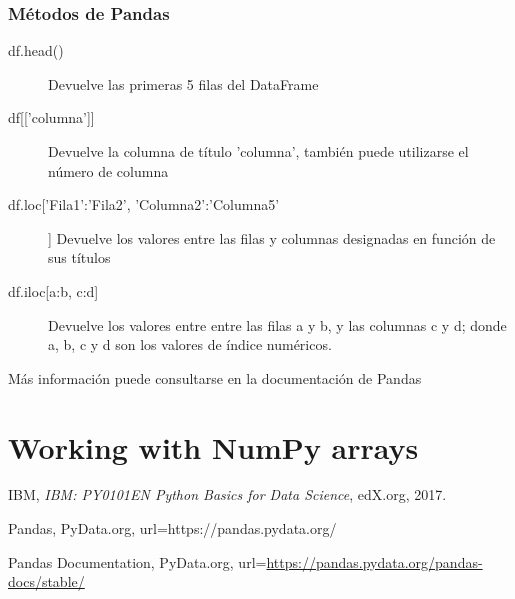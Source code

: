 \documentclass[10pt,a4paper]{article}
\begin{document}
\subsubsection{Métodos de Pandas}
\begin{description}
\item [df.head()] Devuelve las primeras 5 filas del DataFrame
\item [{df[['columna']]}]  Devuelve la columna de título 'columna', también puede utilizarse el número de columna
\item [df.loc['Fila1':'Fila2', 'Columna2':'Columna5']] Devuelve los valores entre las filas y columnas designadas en función de sus títulos
\item [{df.iloc[a:b, c:d]}] Devuelve los valores entre entre las filas a y b, y las columnas c y d; donde a, b, c y d son los valores de índice numéricos.
\end{description}
Más información puede consultarse en la documentación de Pandas \cite{pandasDoc}
\section{Working with NumPy arrays}

\begin{thebibliography}{9}

IBM,
\textit{ IBM: PY0101EN Python Basics for Data Science},
edX.org,
2017.

Pandas,
PyData.org,
url=https://pandas.pydata.org/

Pandas Documentation,
PyData.org,
url=\url{https://pandas.pydata.org/pandas-docs/stable/}

\end{thebibliography}
\end{document}
